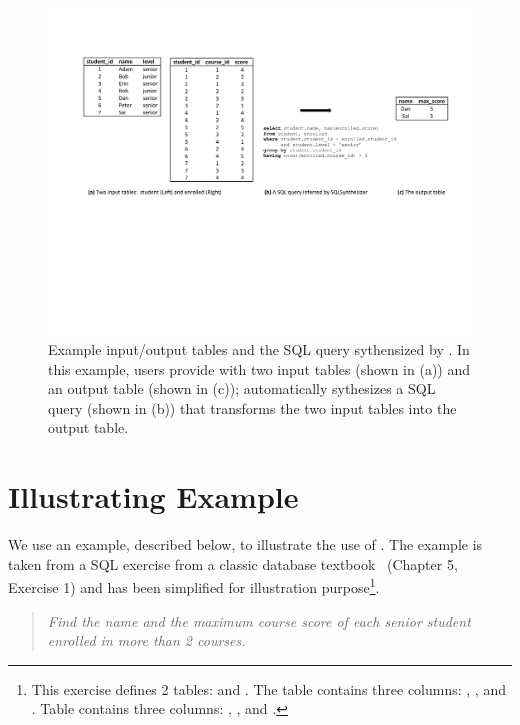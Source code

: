 
\begin{figure}[t]
  \centering
  \includegraphics[scale=0.70]{motivating}
  \vspace*{-1.0ex}\caption {{\label{fig:motivating}
  Example input/output tables and the SQL query sythensized by
  \ourtool. In this example, users provide \ourtool with
  two input tables (shown in (a)) and an output table (shown in (c));
  \ourtool automatically sythesizes a SQL query (shown in (b)) that
  transforms the two input tables into the output table.
}}
\end{figure}

\section{Illustrating Example}
\label{sec:example}

We use an example, described below, to illustrate the use
of \ourtool. The example is
taken from a SQL exercise from a classic
database textbook~\cite{cowbook} (Chapter 5, Exercise 1)
and has been simplified for illustration purpose\footnote{
This exercise defines 2 tables: 
and . The  table
contains three columns: , ,
and . Table  contains
three columns: , ,
and .
}.

\begin{quote}
\textit{Find the name and the maximum course score of each senior student
enrolled in more than 2 courses.}
\end{quote}

